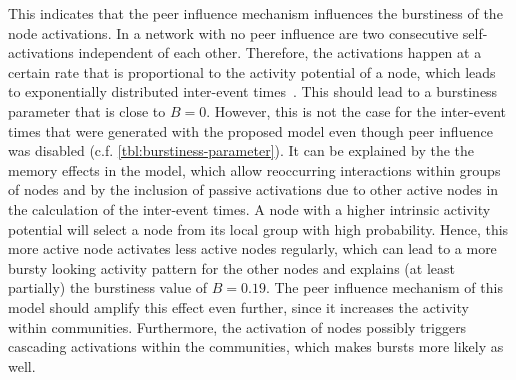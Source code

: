 This indicates that the peer influence mechanism influences the burstiness of the node activations.
In a network with no peer influence are two consecutive self-activations independent of each other.
Therefore, the activations happen at a certain rate that is proportional to the activity potential of a node, which leads to exponentially distributed inter-event times~\cite{Moinet2016}.
This should lead to a burstiness parameter that is close to \( B = 0 \).
However, this is not the case for the inter-event times that were generated with the proposed model even though peer influence was disabled (c.f. \cref{tbl:burstiness-parameter}).
It can be explained by the the memory effects in the model, which allow reoccurring interactions within groups of nodes and by the inclusion of passive activations due to other active nodes in the calculation of the inter-event times.
A node with a higher intrinsic activity potential will select a node from its local group with high probability.
Hence, this more active node activates less active nodes regularly, which can lead to a more bursty looking activity pattern for the other nodes and explains (at least partially) the burstiness value of \( B = 0.19 \).
The peer influence mechanism of this model should amplify this effect even further, since it increases the activity within communities.
Furthermore, the activation of nodes possibly triggers cascading activations within the communities, which makes bursts more likely as well.

